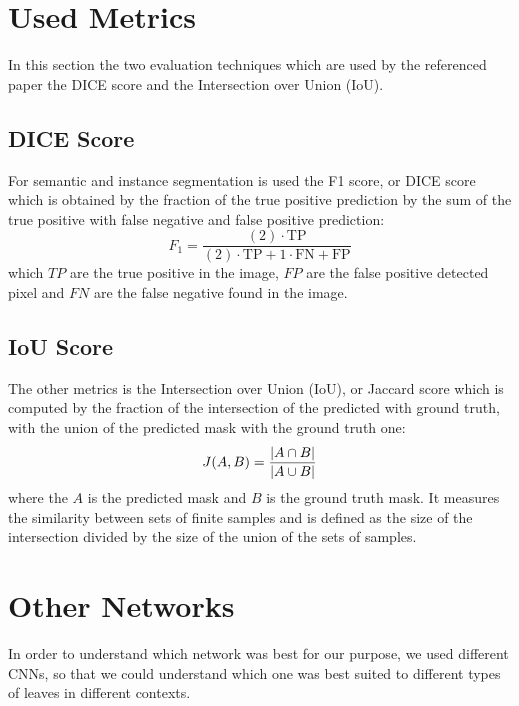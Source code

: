 \section{Used Metrics}
In this section the two evaluation techniques which are used by the referenced paper \cite{scharr2016leaf} the DICE score and the Intersection over Union (IoU).

\subsection{DICE Score}
For semantic and instance segmentation is used the F1 score, or DICE score which is obtained by the fraction of the true positive prediction by the sum of the true positive
with false negative and false positive prediction:
$$F_{1}=\frac{(2)\cdot \mathrm {TP}}{(2)\cdot \mathrm {TP} + 1 \cdot \mathrm {FN} +\mathrm {FP}}$$
which $TP$ are the true positive in the image, $FP$ are the false positive detected pixel and $FN$ are the false negative found in the image.

\subsection{IoU Score}
The other metrics is the Intersection over Union (IoU), or Jaccard score which is computed by the fraction of the intersection of the predicted with ground truth, with the 
union of the predicted mask with the ground truth one:
$$J(A,B)={{|A\cap B|} \over {|A\cup B|}}$$
where the $A$ is the predicted mask and $B$ is the ground truth mask. It measures the similarity between sets of finite samples and is defined as the size of the
intersection divided by the size of the union of the sets of samples.



\section{Other Networks}
In order to understand which network was best for our purpose, we used different CNNs, so that we could understand which one was best suited to different types of leaves
in different contexts.


